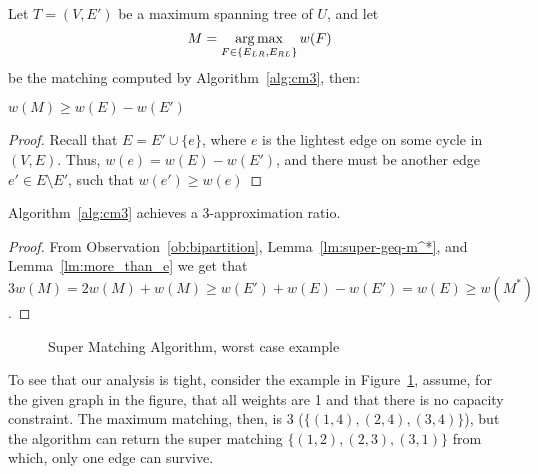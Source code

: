 Let $T = (V, E')$ be a maximum spanning tree of $U$,
and let 
$$M = \operatorname*{arg\,max}_{F \in \{ E_{LR}, E_{RL} \}}{w(F)}$$
be the matching computed by Algorithm~\ref{alg:cm3}, then:

\begin{lemma}
\label{lm:more_than_e}
$w(M) \geq w(E) - w(E')$
\end{lemma}

\begin{proof}
Recall that $E = E' \cup \{e\}$, 
where $e$ is the lightest edge on some cycle in $(V, E)$. 
Thus, $w(e) = w(E) - w(E')$, 
and there must be another edge $e' \in E \setminus E'$, 
such that $w(e') \geq w(e)$
\end{proof}

\begin{theorem}
Algorithm~\ref{alg:cm3} achieves a 3-approximation ratio.
\end{theorem}

\begin{proof}
From Observation~\ref{ob:bipartition}, Lemma~\ref{lm:super-geq-m^*},
and Lemma~\ref{lm:more_than_e} we get that
$$ 3w(M) = 2w(M) + w(M) \geq w(E') + w(E) - w(E') = w(E) \geq w(M^*)$$.
\end{proof}

\begin{figure}
\centering

\caption{
\label{fig:3cm-tight-fig}
Super Matching Algorithm, worst case example
}
\end{figure}

To see that our analysis is tight, consider the example in Figure~\ref{fig:3cm-tight-fig},
assume, for the given graph in the figure, 
that all weights are 1 and that there is no capacity constraint.
The maximum matching, then, is 3 ($\{(1,4), (2,4), (3,4)\}$), 
but the algorithm can return the super matching $\{(1,2), (2,3), (3,1)\}$ from which, 
only one edge can survive.  